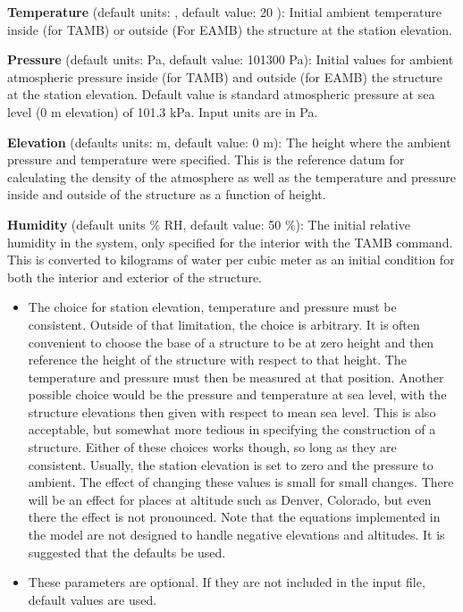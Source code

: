\textbf{Temperature} (default units: \degc, default value: 20 \degc): Initial ambient temperature inside (for TAMB) or outside (For EAMB) the structure at the station elevation.

\textbf{Pressure} (default units: Pa, default value: 101300 Pa): Initial values for ambient atmospheric pressure inside (for TAMB) and outside (for EAMB) the structure at the station elevation. Default value is standard atmospheric pressure at sea level (0 m elevation) of 101.3 kPa. Input units are in Pa.

\textbf{Elevation} (defaults units: m, default value: 0 m): The height where the ambient pressure and temperature were specified.  This is the reference datum for calculating the density of the atmosphere as well as the temperature and pressure inside and outside of the structure as a function of height.

\textbf{Humidity} (default units \% RH, default value: 50 \%): The initial relative humidity in the system, only specified for the interior with the TAMB command.  This is converted to kilograms of water per cubic meter as an initial condition for both the interior and exterior of the structure.


\begin{itemize}
\item The choice for station elevation, temperature and pressure must be consistent.  Outside of that limitation, the choice is arbitrary.  It is often convenient to choose the base of a structure to be at zero height and then reference the height of the structure with respect to that height.  The temperature and pressure must then be measured at that position.  Another possible choice would be the pressure and temperature at sea level, with the structure elevations then given with respect to mean sea level.  This is also acceptable, but somewhat more tedious in specifying the construction of a structure.  Either of these choices works though, so long as they are consistent. Usually, the station elevation is set to zero and the pressure to ambient. The effect of changing these values is small for small changes. There will be an effect for places at altitude such as Denver, Colorado, but even there the effect is not pronounced. Note that the equations implemented in the model are not designed to handle negative elevations and altitudes. It is suggested that the defaults be used.

\item These parameters are optional. If they are not included in the input file, default values are used.
\end{itemize}

